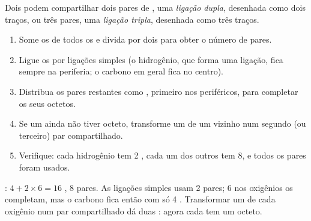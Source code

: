 \begin{definition}\label{def:g10:lewis-and-shape:multiple-bond}
Dois  podem compartilhar dois pares de , uma
\emph{ligação dupla}, desenhada como dois traços, ou
três pares, uma \emph{ligação tripla}, desenhada
como três traços.
\end{definition}

\begin{method}\label{met:g10:lewis-and-shape:draw}
\begin{enumerate}
  \item Some os  de todos os  e divida por dois
        para obter o número de pares.
  \item Ligue os  por ligações simples (o hidrogênio, que forma uma
        ligação, fica sempre na periferia; o carbono em geral fica no
        centro).
  \item Distribua os pares restantes como , primeiro
        nos  periféricos, para completar os seus octetos.
  \item Se um  ainda não tiver octeto, transforme um 
        de um vizinho num segundo (ou terceiro) par compartilhado.
  \item Verifique: cada hidrogênio tem 2 , cada um dos outros
         tem 8, e todos os pares foram usados.
\end{enumerate}
\end{method}

\begin{example}\label{ex:g10:lewis-and-shape:co2}
: $4 + 2 \times 6 = 16$ , 8 pares. As
ligações simples  usam 2 pares; 6  nos
oxigênios os completam, mas o carbono fica então com só 4 .
Transformar um  de cada oxigênio num par compartilhado dá
duas : agora cada  tem um octeto.
\end{example}

